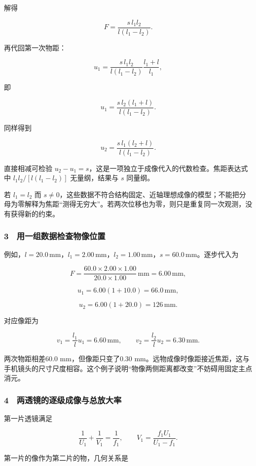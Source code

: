 \documentclass[12pt,a4paper,fontset=fandol]{ctexart}
\begin{document}
解得

\[\boxed{F=\frac{s\,l_1l_2}{l(l_1-l_2)}.}\]

再代回第一次物距：

\[u_1=\frac{s\,l_1l_2}{l(l_1-l_2)}\frac{l_1+l}{l_1},\]

即

\[\boxed{u_1=\frac{s\,l_2(l_1+l)}{l(l_1-l_2)}.}\]

同样得到

\[u_2=\frac{s\,l_1(l_2+l)}{l(l_1-l_2)}.\]

直接相减可检验
\(u_2-u_1=s\)，这是一项独立于成像代入的代数检查。焦距表达式中
\(l_1l_2/[l(l_1-l_2)]\) 无量纲，结果与 \(s\) 同量纲。

若 \(l_1=l_2\) 而
\(s\ne0\)，这些数据不符合结构固定、近轴理想成像的模型；不能把分母为零解释为焦距``测得无穷大''。若两次位移也为零，则只是重复同一次观测，没有获得新的约束。

\subsubsection{3　用一组数据检查物像位置}\label{ux7528ux4e00ux7ec4ux6570ux636eux68c0ux67e5ux7269ux50cfux4f4dux7f6e}

例如，\(l=20.0\,\mathrm{mm}\)，\(l_1=2.00\,\mathrm{mm}\)，\(l_2=1.00\,\mathrm{mm}\)，\(s=60.0\,\mathrm{mm}\)。逐步代入为

\[F=\frac{60.0\times2.00\times1.00}{20.0\times1.00}\,\mathrm{mm}
=6.00\,\mathrm{mm},\]

\[u_1=6.00(1+10.0)=66.0\,\mathrm{mm},\]

\[u_2=6.00(1+20.0)=126\,\mathrm{mm}.\]

对应像距为

\[v_1=\frac{l_1}{l}u_1=6.60\,\mathrm{mm},\qquad
v_2=\frac{l_2}{l}u_2=6.30\,\mathrm{mm}.\]

两次物距相差60.0 mm，但像距只变了0.30
mm。远物成像时像距接近焦距，这与手机镜头的尺寸尺度相容。这个例子说明``物像两侧距离都改变''不妨碍用固定主点消元。

\subsubsection{4　两透镜的逐级成像与总放大率}\label{ux4e24ux900fux955cux7684ux9010ux7ea7ux6210ux50cfux4e0eux603bux653eux5927ux7387}

第一片透镜满足

\[\frac1{U_1}+\frac1{V_1}=\frac1{f_1},\qquad
V_1=\frac{f_1U_1}{U_1-f_1}.\]

第一片的像作为第二片的物，几何关系是
\end{document}
